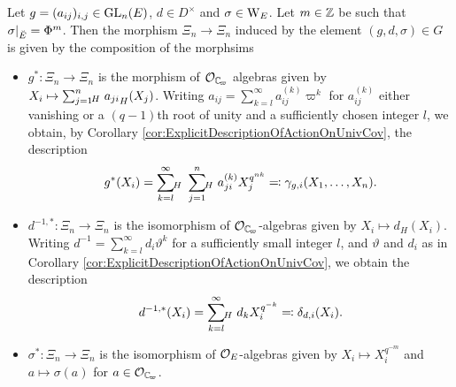 \documentclass[../main.tex]{subfiles}
\begin{document}
\begin{lem}\label{lem:ExplicitActionOnQthPowerRootSystems}
  Let $g = (a_{ij})_{i,j} \in \operatorname{GL}_n(E)$, $d \in D^\times$ and $\sigma \in
  \mathrm W_E$. Let $m \in \mathbb{Z}$ be such that $\sigma|_{{\breve {E}}} = \Phi^m$. Then the
  morphism $\Xi_n \to \Xi_n$ induced by the element $(g, d, \sigma) \in G$ is given by
  the composition of the morphsims
  \begin{itemize}
    \item $g^*\colon \Xi_n \to \Xi_n$ is the morphism of $\cO_\Cp$ algebras given
      by $X_i \mapsto \sum_{j=1}^n {\hspace{-3pt}}_H\hspace{3pt} {a_{ji}}_H(X_j)$. Writing
      $a_{ij} = \sum_{k=l}^\infty a_{ij}^{(k)} \varpi^k$ for  $a_{ij}^{(k)}$
      either vanishing or a $(q-1)$th root of unity and a sufficiently chosen integer
      $l$, we obtain, by Corollary
      \ref{cor:ExplicitDescriptionOfActionOnUnivCov}, the description
      \begin{equation*}
        g^*(X_i) = \sum_{k=l}^\infty {\hspace{-3pt}}_H\hspace{3pt}
        \sum_{j=1}^n{\hspace{-3pt}}_H\hspace{3pt} a_{ji}^{(k)} X_j^{q^{nk}}
        \eqqcolon \gamma_{g,i}(X_1, \dots, X_n).
      \end{equation*}
      
    \item $d^{-1,*} \colon \Xi_n \to \Xi_n$ is the isomorphism of 
      $\cO_\Cp$-algebras given by $X_i \mapsto d_H(X_i)$. 
      Writing $d^{-1} = \sum_{k=l}^\infty d_i \vartheta^k$ for
       a sufficiently small integer $l$, and $\vartheta$ and $d_i$ as in
       Corollary \ref{cor:ExplicitDescriptionOfActionOnUnivCov}, we obtain the
       description
      \begin{equation*}
        d^{-1, *}(X_i) =  \sum_{k=l}^\infty {\hspace{-3pt}}_H\hspace{3pt}
        d_k X_i^{q^{-k}} \eqqcolon \delta_{d, i}(X_i).
      \end{equation*}
    \item $\sigma^*: \Xi_n \to \Xi_n$ is the isomorphism of 
      $\mathcal{O}_E$-algebras given by $X_i \mapsto X_i^{q^{-m}}$ and 
      $a \mapsto \sigma(a)$ for $a \in \cO_\Cp$. 
  \end{itemize}
\end{lem}
\end{document}
